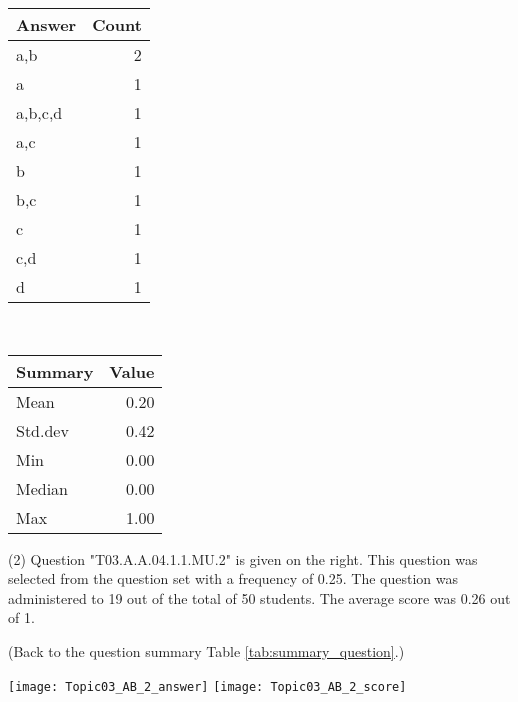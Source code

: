 \documentclass[12pt,english,nohyper]{tufte-handout}\usepackage[]{graphicx}\usepackage[]{color}
\begin{document}
\begin{center}%
\begin{tabular}{lr}
  \hline
Answer & Count \\ 
  \hline
a,b &   2 \\ 
  a &   1 \\ 
  a,b,c,d &   1 \\ 
  a,c &   1 \\ 
  b &   1 \\ 
  b,c &   1 \\ 
  c &   1 \\ 
  c,d &   1 \\ 
  d &   1 \\ 
   \hline
\end{tabular}
~~~~~~~~%
\begin{tabular}{lr}
  \hline
Summary & Value \\ 
  \hline
Mean & 0.20 \\ 
  Std.dev & 0.42 \\ 
  Min & 0.00 \\ 
  Median & 0.00 \\ 
  Max & 1.00 \\ 
   \hline
\end{tabular}
\end{center}\newpage{} (2) Question "T03.A.A.04.1.1.MU.2" is given on the right. This question was selected from the question set with a frequency of 0.25. The question was administered to 19 out of the total of 50 students. The average score was 0.26 out of 1.

 (Back to the question summary Table \ref{tab:summary_question}.)

\begin{center} \texttt{[image: Topic03\_AB\_2\_answer]} \texttt{[image: Topic03\_AB\_2\_score]} \end{center} 
\end{document}
